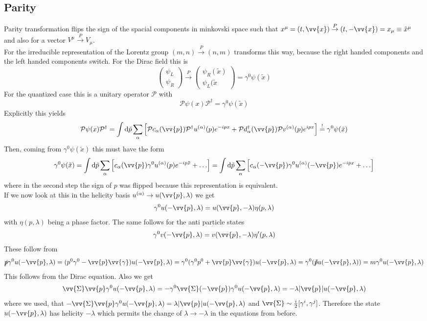 \documentclass{include/thesisclass}
\newcommand{\vx}{\vv{x}}
\newcommand{\vp}{\vv{p}}
\newcommand{\df}{\rightarrow}
\newcommand{\dd}{{\rm d}}
\newcommand{\soll}{\overset{!}{=}}
\newcommand{\vektorz}[2]{\begin{pmatrix} #1 \\ #2 \end{pmatrix}}
\begin{document}
\subsection{Parity}
Parity transformation flips the sign of the spacial components in minkovski space such that $x^\mu = (t, \vx) \overset{P}{\df} (t, - \vx) = x_\mu \equiv \tilde x ^\mu$ and also for a vector $V^\mu \overset{P}{\df} V_\mu$.\\
For the irreducible representation of the Lorentz group $(m, n) \overset{P}{\df} (n,m)$ transforms this way, because the right handed components and the left handed components switch. For the Dirac field this is
\[ \vektorz{\psi_L}{\psi_R} \overset{P}{\df} \vektorz{\psi_R(\tilde x)}{\psi_L(\tilde x} = \gamma^0 \psi(\tilde x)\]
For the quantized case this is a unitary operator $\mathcal{P}$ with
\[ \mathcal{P} \psi(x) \mathcal{P}^\dagger = \gamma^0 \psi(\tilde x)\]
Explicitly this yields
\[ \mathcal{P} \psi(x) \mathcal{P}^\dagger = \int \dd \tilde p \sum_\alpha \left[ \mathcal{P} c_\alpha ( \vp) \mathcal{P} ^\dagger u^{(\alpha)} (p) e^{-ipx} + \mathcal{P} d_\alpha^\dagger(\vp) \mathcal{P} v^{(\alpha)} (p) e^{ipx} \right] \soll \gamma^0 \psi(\tilde x)\]
Then, coming from $\gamma^0 \psi(\tilde x)$ this must have the form
\[ \gamma^0 \psi(\tilde x) = \int \dd \tilde p \sum_\alpha \left[ c_\alpha(\vp) \gamma^0 u^{(\alpha)} (p) e^{-ip \tilde x} + \ldots \right] = \int \dd \tilde p \sum_\alpha \left[ c_\alpha( - \vp) \gamma^0 u^{(\alpha)}(- \vp) e^{-ipx} + \ldots \right]\]
where in the second step the sign of $p$ was flipped because this representation is equivalent.\\
If we now look at this in the helicity basis $u^{(\alpha)} \df u(\vp, \lambda)$ we get
\[ \gamma^0 u(-\vp, \lambda) = u(\vp, - \lambda) \eta(p, \lambda)\]
with $\eta(p,\lambda)$ being a phase factor. The same follows for the anti particle states
\[ \gamma^0 v(- \vp, \lambda) = v( \vp, - \lambda) \eta'(p, \lambda)\]
These follow from
\[ \slashed p \gamma^0 u(-\vp, \lambda) = ( p^0 \gamma^0 - \vp \vv{\gamma}) u(-\vp, \lambda) = \gamma^0(\gamma^0 p^0 + \vp \vv{\gamma}) u(-\vp, \lambda) = \gamma^0(\slashed{\tilde{p}} u(-\vp,\lambda)) =m \gamma^0 u(-\vp, \lambda)\]
This follows from the Dirac equation. Also we get
\[ \vv{\Sigma} \vp \gamma^0 u (-\vp, \lambda) = - \gamma^0 \vv{\Sigma}(-\vp) \gamma^0 u(-\vp, \lambda) = - \lambda | \vp | u ( - \vp, \lambda)\]
where we used, that $-\vv{\Sigma}\vp \gamma^0 u(-\vp, \lambda) = \lambda | \vp | u (- \vp, \lambda)$ and $\vv{\Sigma} \sim \frac{i}{2} [\gamma^i, \gamma^j]$. Therefore the state $u(-\vp, \lambda)$ has helicity $-\lambda$ which permits the change of $\lambda \df - \lambda$ in the equations from before.
\end{document}
